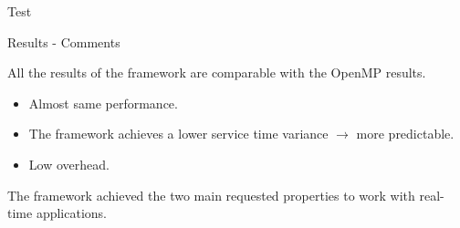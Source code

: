 \documentclass[xcolor=dvipsnames]{beamer}
\begin{document}
\begin{section}{Test}
\begin{frame}{\hskip 0.3cm Results - Comments}

All the results of the framework are comparable with the OpenMP results.

\begin{itemize}

\item Almost same performance.

\item The framework achieves a lower service time variance $\rightarrow$ more predictable.

\item Low overhead.

\end{itemize}

The framework achieved the two main requested properties to work with real-time applications.

\end{frame}












\end{section}
\end{document}
